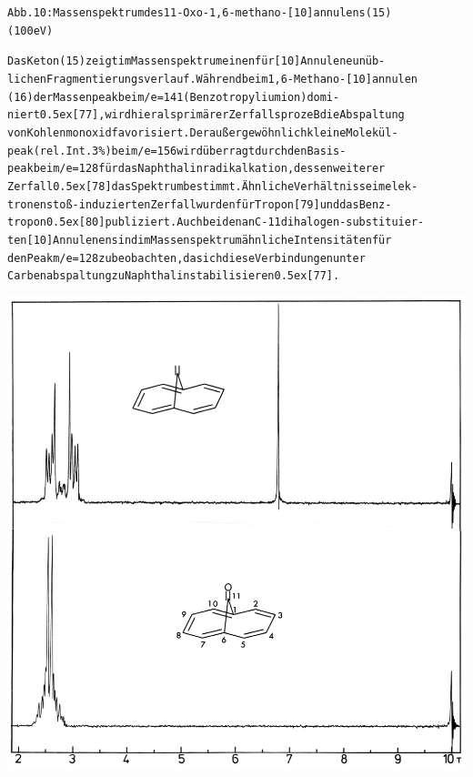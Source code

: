 \documentclass[a4paper,11pt]{article}
\begin{document}
\begin{alltt}
Abb. 10: Massenspektrum des 11-Oxo-1,6-methano-[10]annulens (15)
(100 eV)

Das Keton (15) zeigt im Massenspektrum einen für [10]Annulene unüb-
lichen Fragmentierungsverlauf. Während beim 1,6-Methano-[10]annulen
(16) der Massenpeak bei m/e = 141 (Benzotropyliumion) domi-
niert \raise0.5ex\hbox{[77]}, wird hier als primärer ZerfallsprozeB die Abspaltung
von Kohlenmonoxid favorisiert. Der außergewöhnlich kleine Molekül-
peak (rel. Int. 3 \%) bei m/e = 156 wird überragt durch den Basis-
peak bei m/e = 128 für das Naphthalinradikalkation, dessen weiterer
Zerfall \raise0.5ex\hbox{[78]} das Spektrum bestimmt. Ähnliche Verhältnisse im elek-
tronenstoß-induzierten Zerfall wurden für Tropon [79] und das Benz-
tropon \raise0.5ex\hbox{[80]} publiziert. Auch bei den an C-11 dihalogen-substituier-
ten [10]Annulenen sind im Massenspektrum ähnliche Intensitäten für
den Peak m/e = 128 zu beobachten, da sich diese Verbindungen unter
Carbenabspaltung zu Naphthalin stabilisieren \raise0.5ex\hbox{[77]}.

\newpage
{}

\end{alltt}
\hspace*{-0.25cm}\includegraphics[width=14.283cm]{NMR_011}
\end{document}
